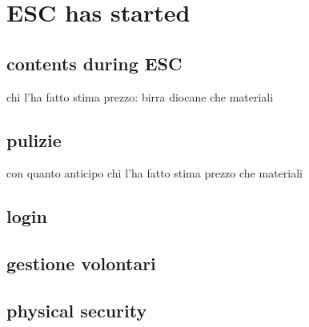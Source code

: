 \chapter{ESC has started}




\section{contents during ESC}
chi l'ha fatto 
stima prezzo: birra diocane
che materiali



\section{pulizie}
con quanto anticipo
chi l'ha fatto 
stima prezzo
che materiali

\section{login}

\section{gestione volontari}

\section{physical security}